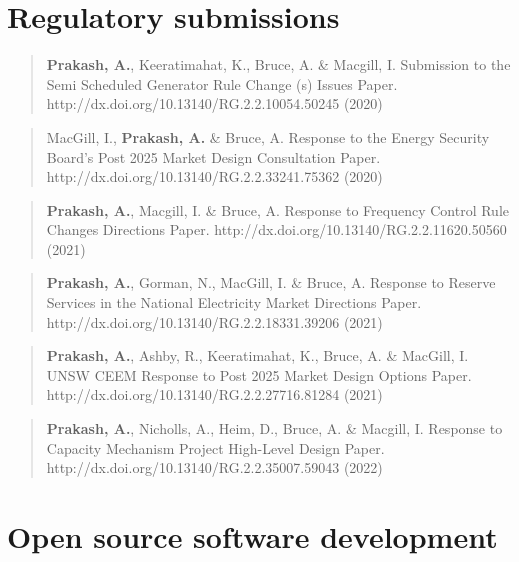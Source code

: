 \documentclass[12pt,a4paper,]{report}
\begin{document}
\hypertarget{regulatory-submissions}{%
\section*{Regulatory submissions}\label{regulatory-submissions}}

\begin{quote}
\textbf{Prakash, A.}, Keeratimahat, K., Bruce, A. \& Macgill, I.
Submission to the Semi Scheduled Generator Rule Change (s) Issues Paper.
http://dx.doi.org/10.13140/RG.2.2.10054.50245 (2020)
\end{quote}

\begin{quote}
MacGill, I., \textbf{Prakash, A.} \& Bruce, A. Response to the Energy
Security Board's Post 2025 Market Design Consultation Paper.
http://dx.doi.org/10.13140/RG.2.2.33241.75362 (2020)
\end{quote}

\begin{quote}
\textbf{Prakash, A.}, Macgill, I. \& Bruce, A. Response to Frequency
Control Rule Changes Directions Paper.
http://dx.doi.org/10.13140/RG.2.2.11620.50560 (2021)
\end{quote}

\begin{quote}
\textbf{Prakash, A.}, Gorman, N., MacGill, I. \& Bruce, A. Response to
Reserve Services in the National Electricity Market Directions Paper.
http://dx.doi.org/10.13140/RG.2.2.18331.39206 (2021)
\end{quote}

\begin{quote}
\textbf{Prakash, A.}, Ashby, R., Keeratimahat, K., Bruce, A. \& MacGill,
I. UNSW CEEM Response to Post 2025 Market Design Options Paper.
http://dx.doi.org/10.13140/RG.2.2.27716.81284 (2021)
\end{quote}

\begin{quote}
\textbf{Prakash, A.}, Nicholls, A., Heim, D., Bruce, A. \& Macgill, I.
Response to Capacity Mechanism Project High-Level Design Paper.
http://dx.doi.org/10.13140/RG.2.2.35007.59043 (2022)
\end{quote}

\hypertarget{open-source-software-development}{%
\section*{Open source software
development}\label{open-source-software-development}}
\end{document}
